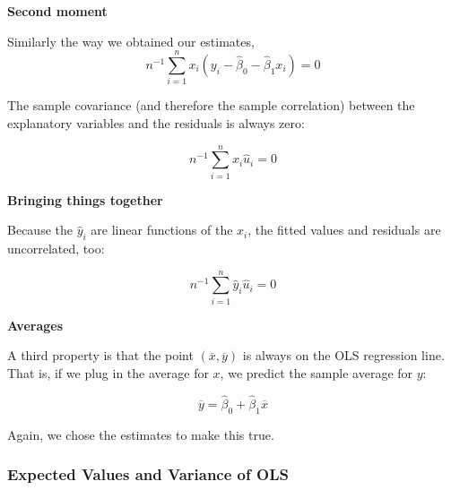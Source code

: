 \documentclass[notes=show]{beamer}
\begin{document}
\begin{frame}[plain]
 \begin{center}
\textbf{Second moment}
\end{center}
Similarly the way we obtained our estimates,
 \begin{equation}
    n^{-1}\sum_{i=1}^{n}x_{i}(y_{i}-\hat{\beta}_{0}-\hat{\beta}_{1}x_{i})=0
 \end{equation}
 
 The sample covariance (and therefore the sample correlation) between the explanatory variables and the residuals is always zero:

 \begin{equation}
   n^{-1} \sum_{i=1}^{n}x_{i}\hat{u}_{i}=0
 \end{equation}

\end{frame}

\begin{frame}[plain]
\begin{center}
\textbf{Bringing things together}
\end{center}

 Because the $\hat{y}_{i}$ are linear functions of the $x_{i}$, the fitted values and residuals are uncorrelated, too:

 \begin{equation}
    n^{-1}\sum_{i=1}^{n}\hat{y}_{i}\hat{u}_{i}=0
 \end{equation}

\bigskip

\end{frame}



\begin{frame}[plain]
\begin{center}
\textbf{Averages}
\end{center}

 A third property is that the point $(\overline{x},\overline{y})$ is always on the OLS regression line. That is, if we plug in the average for $x$, we predict the sample average for $y$:

 \begin{equation}
  \overline{y}=\hat{\beta}_{0}+\hat{\beta}_{1}\overline{x}
 \end{equation}

 Again, we chose the estimates to make this true.
 
\end{frame}

\subsubsection{Expected Values and Variance of OLS}
\end{document}
